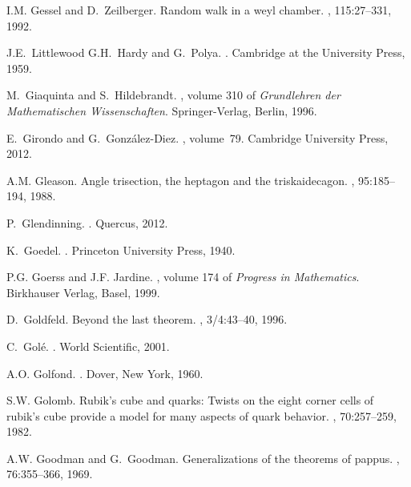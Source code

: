 \documentclass[12pt]{amsart}
\begin{document}
\begin{thebibliography}{100}
I.M. Gessel and D.~Zeilberger.
\newblock Random walk in a weyl chamber.
, 115:27--331, 1992.

J.E.~Littlewood G.H.~Hardy and G.~Polya.
.
\newblock Cambridge at the University Press, 1959.

M.~Giaquinta and S.~Hildebrandt.
, volume 310 of {\em Grundlehren
  der Mathematischen Wissenschaften}.
\newblock Springer-Verlag, Berlin, 1996.

E.~Girondo and G.~Gonz{\'a}lez-Diez.
,
  volume~79.
\newblock Cambridge University Press, 2012.

A.M. Gleason.
\newblock Angle trisection, the heptagon and the triskaidecagon.
, 95:185--194, 1988.

P.~Glendinning.
.
\newblock Quercus, 2012.

K.~Goedel.
.
\newblock Princeton University Press, 1940.

P.G. Goerss and J.F. Jardine.
, volume 174 of {\em Progress in
  Mathematics}.
\newblock Birkhauser Verlag, Basel, 1999.

D.~Goldfeld.
\newblock Beyond the last theorem.
, 3/4:43--40, 1996.

C.~Gol{\'e}.
.
\newblock World Scientific, 2001.

A.O. Golfond.
.
\newblock Dover, New York, 1960.

S.W. Golomb.
\newblock Rubik's cube and quarks: Twists on the eight corner cells of rubik's
  cube provide a model for many aspects of quark behavior.
, 70:257--259, 1982.

A.W. Goodman and G.~Goodman.
\newblock Generalizations of the theorems of pappus.
, 76:355--366, 1969.


\end{thebibliography}
\end{document}
